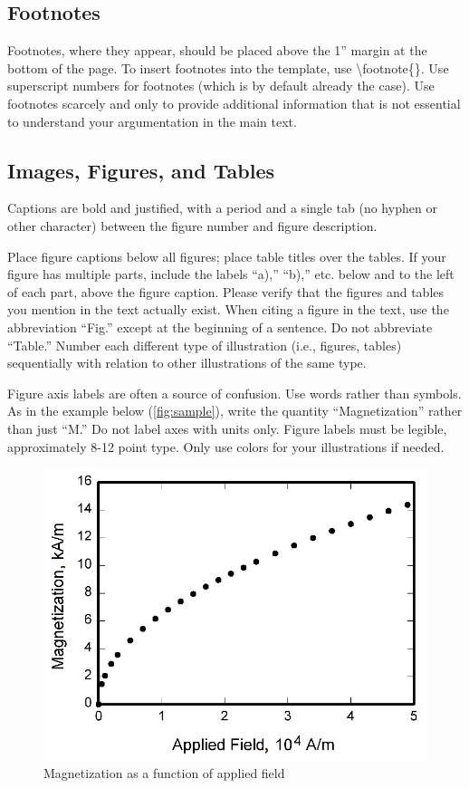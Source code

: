 \subsection{Footnotes}
Footnotes, where they appear, should be placed above the 1” margin at the bottom of the page. To insert footnotes into the template, use \textbackslash footnote\{\}. Use superscript numbers for footnotes (which is by default already the case). Use footnotes scarcely and only to provide additional information that is not essential to understand your argumentation in the main text. 

\subsection{Images, Figures, and Tables}
Captions are bold and justified, with a period and a single tab (no hyphen or other character) between the figure number and figure description.

Place figure captions below all figures; place table titles over the tables. If your figure has multiple parts, include the labels “a),” “b),” etc. below and to the left of each part, above the figure caption. Please verify that the figures and tables you mention in the text actually exist. When citing a figure in the text, use the abbreviation “Fig.” except at the beginning of a sentence. Do not abbreviate “Table.” Number each different type of illustration (i.e., figures, tables) sequentially with relation to other illustrations of the same type.

Figure axis labels are often a source of confusion. Use words rather than symbols. As in the example below (\autoref{fig:sample}), write the quantity “Magnetization” rather than just “M.” Do not label axes with units only. 
Figure labels must be legible, approximately 8-12 point type. Only use colors for your illustrations if needed. 

\begin{figure}[h]
    \centering
    \includegraphics[width=0.4\linewidth]{figures/graph.jpg}
    \caption{Magnetization as a function of applied field}
    \label{fig:sample}
\end{figure}

